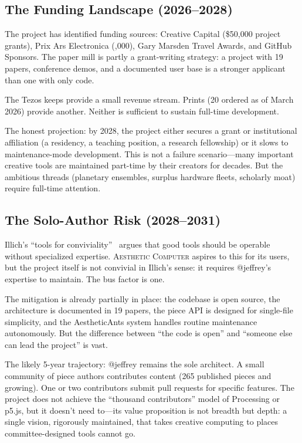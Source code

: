 \documentclass[10pt,letterpaper,twocolumn]{article}
\newcommand{\ac}{\textsc{Aesthetic Computer}}
\begin{document}
\subsection{The Funding Landscape (2026--2028)}

The project has identified funding sources: Creative Capital (\$50,000 project grants), Prix Ars Electronica (,000), Gary Marsden Travel Awards, and GitHub Sponsors. The paper mill is partly a grant-writing strategy: a project with 19 papers, conference demos, and a documented user base is a stronger applicant than one with only code.

The Tezos keeps provide a small revenue stream. Prints (20 ordered as of March 2026) provide another. Neither is sufficient to sustain full-time development.

The honest projection: by 2028, the project either secures a grant or institutional affiliation (a residency, a teaching position, a research fellowship) or it slows to maintenance-mode development. This is not a failure scenario---many important creative tools are maintained part-time by their creators for decades. But the ambitious threads (planetary ensembles, surplus hardware fleets, scholarly moat) require full-time attention.

\subsection{The Solo-Author Risk (2028--2031)}

Illich's ``tools for conviviality''~\citep{illich1973tools} argues that good tools should be operable without specialized expertise. \ac{} aspires to this for its users, but the project itself is not convivial in Illich's sense: it requires @jeffrey's expertise to maintain. The bus factor is one.

The mitigation is already partially in place: the codebase is open source, the architecture is documented in 19 papers, the piece API is designed for single-file simplicity, and the AestheticAnts system handles routine maintenance autonomously. But the difference between ``the code is open'' and ``someone else can lead the project'' is vast.

The likely 5-year trajectory: @jeffrey remains the sole architect. A small community of piece authors contributes content (265 published pieces and growing). One or two contributors submit pull requests for specific features. The project does not achieve the ``thousand contributors'' model of Processing or p5.js, but it doesn't need to---its value proposition is not breadth but depth: a single vision, rigorously maintained, that takes creative computing to places committee-designed tools cannot go.
\end{document}
